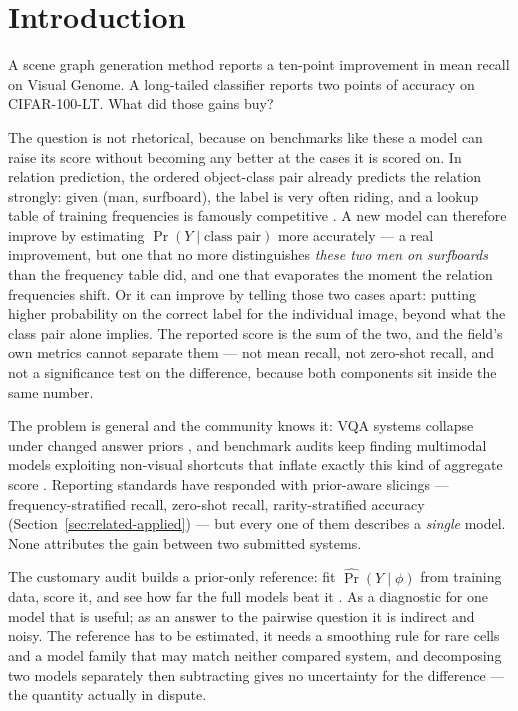\section{Introduction}\label{sec:intro}

A scene graph generation method reports a ten-point improvement in mean recall on Visual
Genome. A long-tailed classifier reports two points of accuracy on CIFAR-100-LT. What did
those gains buy?

The question is not rhetorical, because on benchmarks like these a model can raise its
score without becoming any better at the cases it is scored on. In relation prediction, the
ordered object-class pair already predicts the relation strongly: given
(\textsf{man}, \textsf{surfboard}), the label is very often \textsf{riding}, and a lookup
table of training frequencies is famously competitive \citep{zellers2018neural}. A new model
can therefore improve by estimating $\Pr(Y\mid\text{class pair})$ more accurately --- a real
improvement, but one that no more distinguishes \emph{these two men on surfboards} than the
frequency table did, and one that evaporates the moment the relation frequencies shift. Or
it can improve by telling those two cases apart: putting higher probability on the correct
label for the individual image, beyond what the class pair alone implies. The reported score
is the sum of the two, and the field's own metrics cannot separate them --- not mean recall,
not zero-shot recall, and not a significance test on the difference, because both components
sit inside the same number.

The problem is general and the community knows it: VQA systems collapse under changed
answer priors \citep{agrawal2018dont}, and benchmark audits keep finding multimodal models
exploiting non-visual shortcuts that inflate exactly this kind of aggregate score
\citep{zhou2025shortcut}. Reporting standards have responded with prior-aware slicings ---
frequency-stratified recall, zero-shot recall, rarity-stratified accuracy
(Section~\ref{sec:related-applied}) --- but every one of them describes a \emph{single}
model. None attributes the gain between two submitted systems.

The customary audit builds a prior-only reference: fit $\widehat\Pr(Y\mid\phi)$ from training
data, score it, and see how far the full models beat it \citep{zellers2018neural}. As a
diagnostic for one model that is useful; as an answer to the pairwise question it is indirect
and noisy. The reference has to be estimated, it needs a smoothing rule for rare cells and a
model family that may match neither compared system, and decomposing two models separately
then subtracting gives no uncertainty for the difference --- the quantity actually in dispute.

